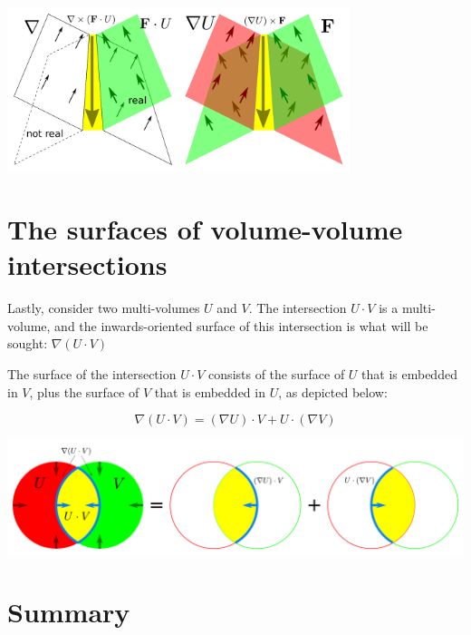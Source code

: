 \begin{center}
\includegraphics[width = 0.75\textwidth]{Boundaries/Surface_boundaries/surface_volume_intersection_mnemonic}
\end{center}




\section{The surfaces of volume-volume intersections}

Lastly, consider two multi-volumes \(U\) and \(V\). The intersection \(U \cdot V\) is a multi-volume, and the inwards-oriented surface of this intersection is what will be sought: \(\nabla(U \cdot V)\)

The surface of the intersection \(U \cdot V\) consists of the surface of \(U\) that is embedded in \(V\), plus the surface of \(V\) that is embedded in \(U\), as depicted below: 

\begin{thm}
\[\nabla(U \cdot V) = (\nabla U) \cdot V + U \cdot (\nabla V)\]
\end{thm}

\begin{center}
\includegraphics[width = \textwidth]{Boundaries/Volume_inwards_oriented_surfaces/volume_volume_intersection_surface}
\end{center}



\section{Summary}


